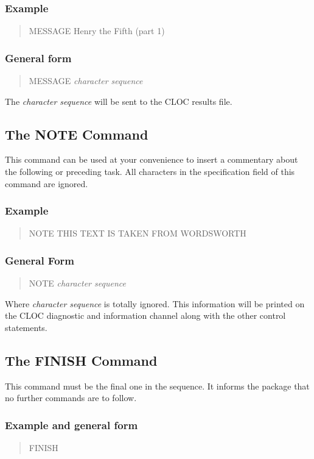 \subsubsection{Example}
\begin{quote}
MESSAGE        Henry the Fifth (part 1)
\end{quote}

\subsubsection{General form}
\begin{quote}
MESSAGE        {\em character sequence}
\end{quote}
The {\em character sequence} will be sent to the CLOC results file.

\subsection{The NOTE Command}
This command can be used at your convenience to insert a
commentary about the following or preceding task.  All characters
in the specification field of this command are ignored.

\subsubsection{Example}
\begin{quote}
NOTE            THIS TEXT IS TAKEN FROM WORDSWORTH
\end{quote}

\subsubsection{General Form}
\begin{quote}
NOTE            {\em character sequence}
\end{quote}
Where {\em character sequence} is totally ignored.  This information will
be printed on the CLOC diagnostic and information channel along
with the other control statements.

\subsection{The FINISH Command}
This command must be the final one in the sequence.  It informs the
package that no further commands are to follow.
\subsubsection{Example and general form}
\begin{quote}
FINISH
\end{quote}

